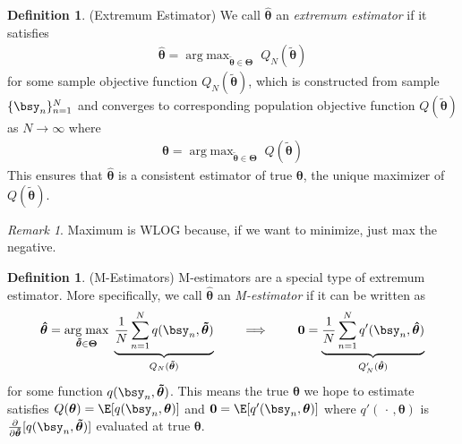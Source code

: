 \documentclass[12pt]{article}
\theoremstyle{plain}
\theoremstyle{definition}
\newtheorem{defn}[thm]{Definition}
\theoremstyle{remark}
\newtheorem*{rmk}{Remark}
\newcommand{\ra}{\rightarrow}
\newcommand{\bstheta}{\boldsymbol{\theta}}
\newcommand{\bsTheta}{\boldsymbol{\Theta}}
\newcommand{\bshattheta}{\boldsymbol{\hat{\theta}}}
\newcommand{\bstildetheta}{\boldsymbol{\tilde{\theta}}}
\renewcommand{\bso}{\boldsymbol{0}}
\DeclareMathOperator*{\argmax}{arg\;max}
\newcommand{\sumnN}{\sum^N_{n=1}}
\newcommand{\nN}{_{n=1}^N}
\begin{document}
\begin{defn}(Extremum Estimator)
We call $\bshattheta$ an \emph{extremum estimator} if it satisfies
\begin{align*}
  \bshattheta = \argmax_{\bstildetheta\in\bsTheta}\;
  Q_N(\bstildetheta)
\end{align*}
for some sample objective function $Q_N(\bstildetheta)$, which is
constructed from sample $\{\bsy_n\}\nN$ and converges to corresponding
population objective function $Q(\bstildetheta)$ as $N\ra\infty$ where
\begin{align*}
  \bstheta = \argmax_{\bstildetheta\in\bsTheta}\;
  Q(\bstildetheta)
\end{align*}
This ensures that $\bshattheta$ is a consistent estimator of true
$\bstheta$, the unique maximizer of $Q(\bstildetheta)$.
\end{defn}
\begin{rmk}
Maximum is WLOG because, if we want to minimize, just max the negative.
\end{rmk}

\begin{defn}(M-Estimators)
M-estimators are a special type of extremum estimator. More
specifically, we call $\bshattheta$ an \emph{M-estimator} if it can be
written as
\begin{align*}
  \bshattheta =
  \argmax_{\bstildetheta\in\bsTheta}\;
  \underbrace{%
  \frac{1}{N}
  \sumnN q(\bsy_n,\bstildetheta)
  }_{Q_N(\bstildetheta)}
  \qquad\implies\qquad
  \bso
  = \underbrace{%
    \frac{1}{N}\sumnN q'(\bsy_n, \bshattheta)
  }_{Q'_N(\bshattheta)}
\end{align*}
for some function $q(\bsy_n,\bstildetheta)$.
This means the true $\bstheta$ we hope to estimate satisfies
$Q(\bstheta)=\E[q(\bsy_n,\bstheta)]$ and $\bso=\E[q'(\bsy_n,\bstheta)]$
where $q'(\,\cdot\,,\bstheta)$ is
$\frac{\partial}{\partial\bstildetheta}[q(\bsy_n,\bstildetheta)]$
evaluated at true $\bstheta$.
\end{defn}
\end{document}
